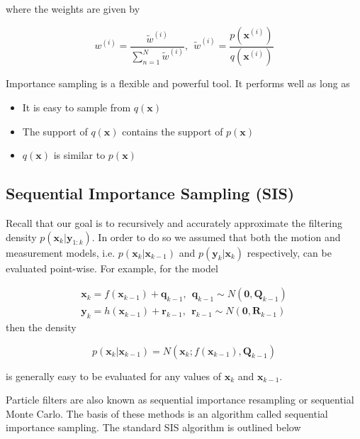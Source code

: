where the weights are given by

\begin{equation}
w^{(i)} = \frac{\tilde{w}^{(i)}}{\sum_{n=1}^N \tilde{w}^{(i)}}, ~~ \tilde{w}^{(i)} = \frac{p(\mathbf{x}^{(i)})}{q(\mathbf{x}^{(i)})}
\end{equation}

Importance sampling is a flexible and powerful tool. It performs well as long as

\begin{itemize}
\item It is easy to sample from $q(\mathbf{x})$
\item The support of $q(\mathbf{x})$ contains the support of $p(\mathbf{x})$
\item $q(\mathbf{x})$ is similar to $p(\mathbf{x})$
\end{itemize}

\subsection{Sequential Importance Sampling (SIS)}
\label{sequential_importance_sampling}

Recall that our goal is to recursively and accurately approximate the filtering density $p(\mathbf{x}_k | \mathbf{y}_{1:k})$.
In order to do so we assumed that both the motion and measurement models, i.e. $p(\mathbf{x}_k | \mathbf{x}_{k-1})$ and $p(\mathbf{y}_k | \mathbf{x}_{k})$
respectively, can be evaluated point-wise. For example, for the model 

\begin{eqnarray}
\mathbf{x}_k = f(\mathbf{x}_{k-1}) + \mathbf{q}_{k-1}, ~~ \mathbf{q}_{k-1} \sim N(\mathbf{0}, \mathbf{Q}_{k-1}) \\
\mathbf{y}_k = h(\mathbf{x}_{k-1}) + \mathbf{r}_{k-1}, ~~ \mathbf{r}_{k-1} \sim N(\mathbf{0}, \mathbf{R}_{k-1}) 
\end{eqnarray}
then the density 

\begin{equation}
p(\mathbf{x}_k | \mathbf{x}_{k-1}) = N(\mathbf{x}_k; f(\mathbf{x}_{k-1}), \mathbf{Q}_{k-1})
\end{equation}

is generally easy to be evaluated for any values of $ \mathbf{x}_k$ and $\mathbf{x}_{k-1}$.

Particle filters are also known as sequential importance resampling or sequential Monte Carlo.
The basis of these methods is an algorithm called  sequential importance sampling. The standard SIS algorithm
is outlined below 


